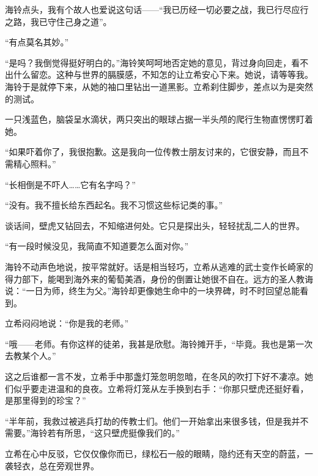 \documentclass{article}
\begin{document}
海铃点头，我有个故人也爱说这句话——“我已历经一切必要之战，我已行尽应行之路，我已守住己身之道”。



“有点莫名其妙。”



“是吗？我倒觉得挺好明白的。”海铃笑呵呵地否定她的意见，背过身向回走，看不出什么留恋。这种与世界的膈膜感，不知怎的让立希安心下来。她说，请等等我。海铃于是就停下来，从她的袖口里钻出一道黑影。立希刹住脚步，差点以为是突然的测试。



一只浅蓝色，脑袋呈水滴状，两只突出的眼球占据一半头颅的爬行生物直愣愣盯着她。



“如果吓着你了，我很抱歉。这是我向一位传教士朋友讨来的，它很安静，而且不需精心照料。”



“长相倒是不吓人……它有名字吗？”



“没有。我不擅长给东西起名。我不习惯这些标记类的事。”



谈话间，壁虎又钻回去，不知缩进何处。它只是探出头，轻轻扰乱二人的世界。



“有一段时候没见，我简直不知道要怎么面对你。”



海铃不动声色地说，按平常就好。话是相当轻巧，立希从逃难的武士变作长崎家的得力部下，能喝到海外来的葡萄美酒，身份的倒置让她很不自在。远方的圣人教诲说：“一日为师，终生为父。”海铃却更像她生命中的一块界碑，时不时回望总能看到。



立希闷闷地说：“你是我的老师。”



“哦——老师。有你这样的徒弟，我甚是欣慰。海铃摊开手，“毕竟。我也是第一次去教某个人。”



这之后谁都一言不发，立希手中那盏灯笼忽明忽暗，在冬风的吹打下好不凄凉。她们似乎要走进温和的良夜。立希将灯笼从左手换到右手：“你那只壁虎还挺好看，是那里得到的珍宝？”



“半年前，我救过被逃兵打劫的传教士们。他们一开始拿出来很多钱，但是我并不需要。”海铃若有所思，“这只壁虎挺像我们的。”



立希在心中反驳，它仅仅像你而已，绿松石一般的眼睛，隐约还有天空的蔚蓝，一袭轻衣，总在旁观世界。
\end{document}
